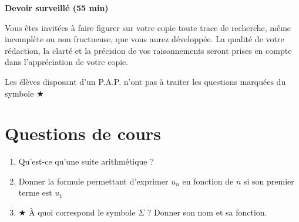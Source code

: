 \documentclass[oneside,12pt]{exam}          %
\begin{document}
\footer{}{\footnotesize \etablissement}{}

\hrulefill\raisebox{-1.9pt}{\quad\decofourleft~\decosix~\decofourright \quad}\hrulefill

\begin{center}
	\textbf{\large Devoir surveillé  (55 min)}
\end{center}
\vspace{-5pt}
Vous êtes invité\textperiodcentered e\textperiodcentered s à faire figurer sur votre copie toute trace de recherche, même incomplète ou non fructueuse, que vous aurez développée. La qualité de votre rédaction, la clarté et la précision de vos raisonnements seront prises en compte dans l’appréciation de votre copie.

Les élèves disposant d'un P.A.P. n'ont pas à traiter les questions marquées du symbole $\bigstar$

\vspace{-8pt}\hrulefill\raisebox{-1.9pt}{\quad\decofourleft~\decosix~\decofourright \quad}\hrulefill
\vspace{5pt}



\section{Questions de cours}
\begin{enumerate}[itemsep = 0pt]
	\item Qu'est-ce qu'une suite arithmétique ?
	\item Donner la formule permettant d'exprimer $u_n$ en fonction de $n$ si son premier terme est $u_1$
	\item $\bigstar$ À quoi correspond le symbole $\Sigma$ ? Donner son nom et sa fonction.
\end{enumerate}
\end{document}
